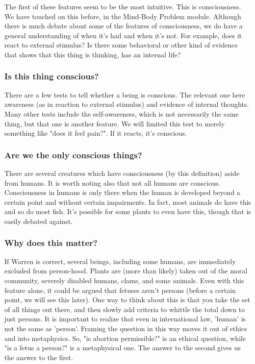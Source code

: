 The first of these features seem to be the most intuitive. This is consciousness. We have touched on this before, in the Mind-Body Problem module. Although there is much debate about some of the features of consciousness, we do have a general understanding of when it's had and when it's not. For example, does it react to external stimulus? Is there some behavioral or other kind of evidence that shows that this thing is thinking, has an internal life? 

\subsubsection{Is this thing conscious?}

There are a few tests to tell whether a being is conscious. The relevant one here awareness (as in reaction to external stimulus) and evidence of internal thoughts. Many other tests include the self-awareness, which is not necessarily the same thing, but that one is another feature. We will limited this test to merely something like "does it feel pain?". If it reacts, it's conscious.

\subsubsection{Are we the only conscious things?}

There are several creatures which have consciousness (by this definition) aside from humans. It is worth noting also that not all humans are conscious. Consciousness in humans is only there when the human is developed beyond a certain point and without certain impairments. In fact, most animals do have this and so do most fish. It's possible for some plants to even have this, though that is easily debated against.

\subsubsection{Why does this matter?}

If Warren is correct, several beings, including some humans, are immediately excluded from person-hood. Plants are (more than likely) taken out of the moral community, severely disabled humans, clams, and some animals. Even with this feature alone, it could be argued that fetuses aren't persons (before a certain point, we will see this later). One way to think about this is that you take the set of all things out there, and then slowly add criteria to whittle the total down to just persons. It is important to realize that even in international law, 'human' is not the same as 'person'.  Framing the question in this way moves it out of ethics and into metaphysics. So, "is abortion permissible?" is an ethical question, while "is a fetus a person?" is a metaphysical one. The answer to the second gives us the answer to the first.


